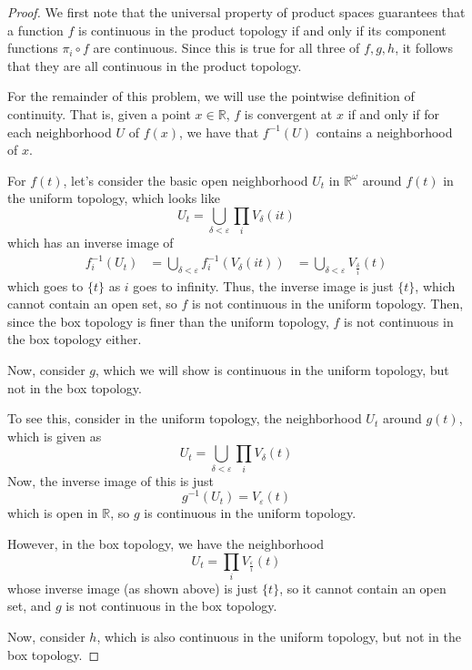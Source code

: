 \documentclass[fontsize=11pt]{scrartcl} %
\numberwithin{equation}{section} %
\numberwithin{figure}{section} %
\numberwithin{table}{section} %
\newcommand{\R}{\mathbb{R}}
\begin{document}
\begin{proof}
We first note that the universal property of product spaces guarantees that a
    function $f$ is continuous in the product topology if and only if its
    component functions $\pi_i\circ f$ are continuous.  Since this is true for
    all three of $f,g,h$, it follows that they are all continuous in the product
    topology.

For the remainder of this problem, we will use the pointwise definition of
    continuity. That is, given a point $x\in\R$, $f$ is convergent at $x$ if and
    only if for each neighborhood $U$ of $f(x)$, we have that $f^{-1}(U)$
    contains a neighborhood of $x$.

For $f(t)$, let's consider the basic open neighborhood $U_t$ in
    $\R^{\omega}$ around $f(t)$ in the uniform topology, which looks like
    \[
        U_t = \bigcup_{\delta<\varepsilon} \prod_i V_{\delta}(it)
    \]
    which has an inverse image of
    \[
        \begin{aligned}
            f_i^{-1}(U_t) &= \bigcup_{\delta<\varepsilon}
            f_i^{-1}(V_{\delta}(it))
                        &= \bigcup_{\delta<\varepsilon}V_{\frac{\delta}{i}}(t)
        \end{aligned}
    \]
    which goes to $\{t\}$ as $i$ goes to infinity. Thus, the inverse image is
    just $\{t\}$, which cannot contain an open set, so $f$ is not continuous
    in the uniform topology. Then, since the box topology is finer than
    the uniform topology, $f$ is not continuous in the box topology either.

    Now, consider $g$, which we will show is continuous in the uniform
    topology, but not in the box topology.

    To see this, consider in the uniform topology, the neighborhood $U_t$
    around $g(t)$, which is given as
    \[
        U_t = \bigcup_{\delta<\varepsilon} \prod_i V_{\delta}(t)
    \]
    Now, the inverse image of this is just
    \[
    g^{-1}(U_t) = V_{\varepsilon}(t)
    \]
    which is open in $\R$, so $g$ is continuous in the uniform topology.

    However, in the box topology, we have the neighborhood
    \[
        U_t = \prod_i V_{\frac{\varepsilon}{i}}(t)
    \]
    whose inverse image (as shown above) is just $\{t\}$, so it cannot contain
    an open set, and $g$ is not continuous in the box topology.

    Now, consider $h$, which is also continuous in the uniform
    topology, but not in the box topology.
    

\end{proof}
\end{document}
